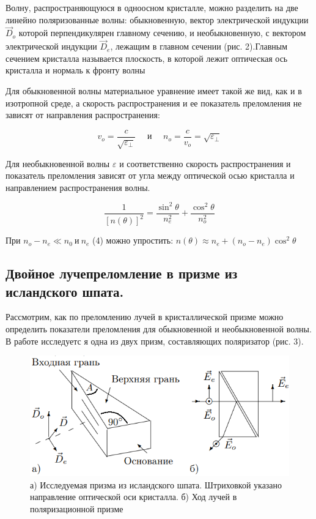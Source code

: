 \documentclass[a4paper,12pt]{article}
\begin{document}
Волну, распространяющуюся в одноосном кристалле, можно разделить на две линейно поляризованные волны: обыкновенную, вектор электрической индукции $\vec{D}_o$ которой перпендикулярен главному сечению, и необыкновенную, с вектором электрической индукции $\vec{D}_e$, лежащим в главном сечении (рис. 2).Главным сечением кристалла называется плоскость, в которой
лежит оптическая ось кристалла и нормаль к фронту волны

Для обыкновенной волны материальное уравнение имеет такой же вид, как и в изотропной среде, а скорость распространения и ее показатель преломления не зависят от направления распространения:

\[
v_{o}=\frac{c}{\sqrt{\varepsilon_{\perp}}} \quad \text { и } \quad n_{o}=\frac{c}{v_{o}}=\sqrt{\varepsilon_{\perp}} 
\]

Для необыкновенной волны $\varepsilon$ и соответственно  скорость распространения и показатель преломления зависят от угла между оптической осью кристалла и направлением распространения волны.

\begin{equation}
\frac{1}{[n(\theta)]^{2}}=\frac{\sin ^{2} \theta}{n_{e}^{2}}+\frac{\cos ^{2} \theta}{n_{o}^{2}}
\end{equation}

При $n_o - n_e \ll n_0 \ и \ n_e$ (4) можно упростить: $ n(\theta) \approx n_e + (n_o - n_e) \cos^2 \theta$

\newpage

\subsection*{Двойное лучепреломление в призме из исландского шпата.}

Рассмотрим, как по преломлению лучей в кристаллической призме можно определить показатели преломления для обыкновенной и необыкновенной волны. В работе исследуетс я одна из двух призм, составляющих поляризатор (рис. 3).

\begin{figure}[h]
	\begin{center}
	\includegraphics[scale=1]{fig3}
	\caption{а) Исследуемая призма из исландского шпата. Штриховкой указано направление оптической оси кристалла. б) Ход лучей в поляризационной призме}
	\end{center}
\end{figure}
\end{document}
